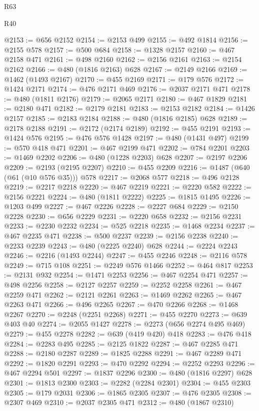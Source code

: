 \begin{lexlean}{R63}
\begin{lexlean}{R40}
\begin{coremodule}
{{{{{{{{{{{{{{{{{{{{{{{{{{{{{{{{{{{{{{{{{{{{{{{{{{{{{{{{{{{{{{{{{{{{{{{{{{{{{{{{{{{{{{{{{{{{{{{{{{{{{{{{{{{{{@2153 := @656 @2152
@2154 := @2153 @499
@2155 := @492 @1814
@2156 := @2155 @578
@2157 := @500 @684
@2158 := @1328 @2157
@2160 := @467 @2158 @471
@2161 := @498 @2160
@2162 := @2156 @2161
@2163 := @2154 @2162
@2166 := @480 (@1816 @2163) @628
@2167 := @2149 @2166
@2169 := @1462 (@1493 @2167)
@2170 := @455 @2169
@2171 := @179 @576
@2172 := @1424 @2171
@2174 := @476 @2171 @469
@2176 := @2037 @2171 @471
@2178 := @480 (@1811 @2176)
@2179 := @2065 @2171
@2180 := @467 @1829
@2181 := @2180 @471
@2182 := @2179 @2181
@2183 := @2153 @2182
@2184 := @1426 @2157
@2185 := @2183 @2184
@2188 := @480 (@1816 @2185) @628
@2189 := @2178 @2188
@2191 := @2172 (@2174 @2189)
@2192 := @455 @2191
@2193 := @1424 @576
@2195 := @476 @576 @1428
@2197 := @480 (@1431 @497)
@2199 := @570 @418 @471
@2201 := @467 @2199 @471
@2202 := @784 @2201
@2203 := @1469 @2202
@2206 := @480 (@1228 @2203) @628
@2207 := @2197 @2206
@2209 := @2193 (@2195 @2207)
@2210 := @455 @2209
@2216 := @1487 (@640 (@61 (@10 @576 @35))) @578
@2217 := @2068 @577
@2218 := @496 @2128
@2219 := @2217 @2218
@2220 := @467 @2219
@2221 := @2220 @582
@2222 := @2156 @2221
@2224 := @480 (@1811 @2222)
@2225 := @1815 @1495
@2226 := @1203 @499
@2227 := @467 @2226
@2228 := @2227 @684
@2229 := @2150 @2228
@2230 := @656 @2229
@2231 := @2220 @658
@2232 := @2156 @2231
@2233 := @2230 @2232
@2234 := @525 @2218
@2235 := @1468 @2234
@2237 := @467 @2235 @471
@2238 := @500 @2237
@2239 := @2156 @2238
@2240 := @2233 @2239
@2243 := @480 (@2225 @2240) @628
@2244 := @2224 @2243
@2246 := @2216 (@1493 @2244)
@2247 := @455 @2246
@2248 := @2116 @578
@2249 := @715 @108
@2251 := @2249 @576 @1466
@2252 := @464 @817
@2253 := @2131 @932
@2254 := @1471 @2253
@2256 := @467 @2254 @471
@2257 := @498 @2256
@2258 := @2127 @2257
@2259 := @2252 @2258
@2261 := @467 @2259 @471
@2262 := @2121 @2261
@2263 := @1469 @2262
@2265 := @467 @2263 @471
@2266 := @496 @2265
@2267 := @470 @2266
@2268 := @1468 @2267
@2270 := @2248 (@2251 @2268)
@2271 := @455 @2270
@2273 := @639 @403 @40
@2274 := @2055 @1427
@2278 := @2273 (@656 @2274 @495 @469)
@2279 := @455 @2278
@2282 := @639 (@419 @420) @418
@2283 := @476 @418
@2284 := @2283 @495
@2285 := @2125 @1822
@2287 := @467 @2285 @471
@2288 := @2180 @2287
@2289 := @1825 @2288
@2291 := @467 @2289 @471
@2292 := @1820 @2291
@2293 := @470 @2292
@2294 := @2252 @2293
@2296 := @467 @2294 @501
@2297 := @1837 @2296
@2300 := @480 (@1816 @2297) @628
@2301 := @1813 @2300
@2303 := @2282 (@2284 @2301)
@2304 := @455 @2303
@2305 := @179 @2031
@2306 := @1865 @2305
@2307 := @476 @2305
@2308 := @2307 @469
@2310 := @2037 @2305 @471
@2312 := @480 (@1867 @2310)
}}}}}}}}}}}}}}}}}}}}}}}}}}}}}}}}}}}}}}}}}}}}}}}}}}}}}}}}}}}}}}}}}}}}}}}}}}}}}}}}}}}}}}}}}}}}}}}}}}}}}}}}}}}}}
\end{coremodule}
\end{lexlean}
\end{lexlean}
